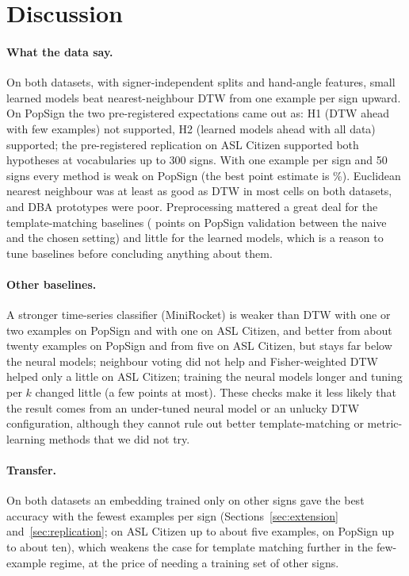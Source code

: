 \section{Discussion}
\paragraph{What the data say.} On both datasets, with signer-independent splits and hand-angle features, small learned models beat
nearest-neighbour DTW from one example per sign upward. On PopSign the two pre-registered expectations came out as: H1 (DTW ahead with
few examples) not supported, H2 (learned models ahead with all data) supported; the pre-registered replication on ASL Citizen supported
both hypotheses at vocabularies up to 300 signs. With one example per sign and 50 signs every method is weak on PopSign (the best point
estimate is \accTransVFiftyKOne\%). Euclidean nearest neighbour was at least as good as DTW in most cells on both datasets, and DBA
prototypes were poor. Preprocessing mattered a great deal for the template-matching baselines (\tuneGapDtw{} points on PopSign validation between the
naive and the chosen setting) and little for the learned models, which is a reason to tune baselines before concluding anything about them.

\paragraph{Other baselines.} A stronger time-series classifier (MiniRocket) is weaker than DTW with one or two examples on PopSign and with one on ASL Citizen, and better from about twenty examples on PopSign and
from five on ASL Citizen, but stays far below the neural models; neighbour voting did not help and Fisher-weighted DTW helped only a little on ASL Citizen; training the neural models longer and tuning per $k$ changed
little (a few points at most). These checks make it less likely that the result comes from an under-tuned neural model or an unlucky DTW configuration, although
they cannot rule out better template-matching or metric-learning methods that we did not try.

\paragraph{Transfer.} On both datasets an embedding trained only on other signs gave the best accuracy with the fewest examples per sign (Sections~\ref{sec:extension} and~\ref{sec:replication}; on ASL Citizen up to about five examples, on PopSign up to about ten), which weakens the case for template
matching further in the few-example regime, at the price of needing a training set of other signs.

